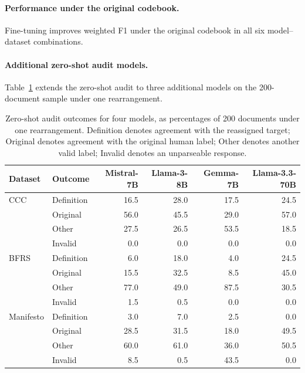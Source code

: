 \documentclass[11pt]{article}
\begin{document}
\paragraph{Performance under the original codebook.}
Fine-tuning improves weighted F1 under the original codebook in all six model–dataset combinations.

\paragraph{Additional zero-shot audit models.}
Table~\ref{tab:crossmodel} extends the zero-shot audit to three additional models on the 200-document sample under one rearrangement.

\begin{table}[!t]
\centering
\begin{tabular}{llrrrr}
\toprule
Dataset & Outcome & Mistral-7B & Llama-3-8B & Gemma-7B & Llama-3.3-70B  \\
\midrule
CCC & Definition & 16.5 & 28.0 & 17.5 & 24.5  \\
    & Original   & 56.0 & 45.5 & 29.0 & 57.0  \\
    & Other      & 27.5 & 26.5 & 53.5 & 18.5 \\
    & Invalid    & 0.0  & 0.0  & 0.0  & 0.0   \\
\midrule
BFRS & Definition & 6.0  & 18.0 & 4.0  & 24.5  \\
     & Original   & 15.5 & 32.5 & 8.5  & 45.0  \\
     & Other      & 77.0 & 49.0 & 87.5 & 30.5  \\
     & Invalid    & 1.5  & 0.5  & 0.0  & 0.0   \\
\midrule
Manifesto & Definition & 3.0  & 7.0  & 2.5  & 0.0   \\
          & Original   & 28.5 & 31.5 & 18.0 & 49.5  \\
          & Other      & 60.0 & 61.0 & 36.0 & 50.5  \\
          & Invalid    & 8.5  & 0.5  & 43.5 & 0.0   \\
\bottomrule
\end{tabular}
\caption{Zero-shot audit outcomes for four models, as percentages of 200 documents under one rearrangement. Definition denotes agreement with the reassigned target; Original denotes agreement with the original human label; Other denotes another valid label; Invalid denotes an unparseable response. }
\label{tab:crossmodel}
\end{table}
\end{document}

